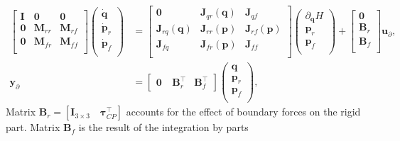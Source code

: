 \begin{equation}
\label{eq:EB_sys}
\begin{aligned}
\begin{bmatrix}
\mathbf{I} & \mathbf{0} & \mathbf{0} \\
\mathbf{0} & \mathbf{M}_{rr} & \mathbf{M}_{rf}\\ 
\mathbf{0} & \mathbf{M}_{fr} & \mathbf{M}_{ff}\\
\end{bmatrix} 
\begin{pmatrix}
\dot{\mathbf{q}} \\ 
\dot{\mathbf{p}}_{r} \\ 
\dot{\mathbf{p}}_{f} \\ 
\end{pmatrix} &= 
\begin{bmatrix}
\mathbf{0} & \mathbf{J}_{qr}(\mathbf{q}) & \mathbf{J}_{qf} \\
\mathbf{J}_{rq}(\mathbf{q}) & \mathbf{J}_{rr}(\mathbf{p}) & \mathbf{J}_{rf}(\mathbf{p})\\ 
\mathbf{J}_{fq} & \mathbf{J}_{fr}(\mathbf{p}) & \mathbf{J}_{ff}\\
\end{bmatrix}  
\begin{pmatrix}
\partial_{\mathbf{q}} H \\
{\mathbf{p}}_{r} \\ 
{\mathbf{p}}_{f} \\ 
\end{pmatrix} + 
\begin{bmatrix}
\mathbf{0} \\
\mathbf{B}_{r} \\ 
\mathbf{B}_{f} \\ 
\end{bmatrix}
\mathbf{u}_\partial, \\
\mathbf{y}_\partial &= \begin{bmatrix}
\mathbf{0} \ & \mathbf{B}_{r}^\top & \mathbf{B}_{f}^\top  
\end{bmatrix} \begin{pmatrix}
\mathbf{q} \\
{\mathbf{p}}_{r} \\ 
{\mathbf{p}}_{f} \\ 
\end{pmatrix},
\end{aligned}
\end{equation}
Matrix $\mathbf{B}_{r} = [\mathbf{I}_{3\times 3} \quad \bm\tau_{CP}^\top]$ accounts for the effect of boundary forces on the rigid part. Matrix $\mathbf{B}_{f}$  is the result of the integration by parts
